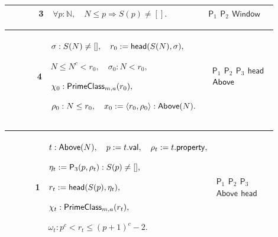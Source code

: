 \documentclass[12pt,reqno]{amsart}
\theoremstyle{blueplain}
\numberwithin{equation}{section}
\begin{document}
{\scriptsize \setlength{\parskip}{0pt}\nointerlineskip
\noindent 
\begin{tabular}{|@{}>{\centering\arraybackslash}m{0.10658\linewidth}|>{\centering\arraybackslash}m{0.03553\linewidth}|>{\centering\arraybackslash}m{0.52105\linewidth}|>{\centering\arraybackslash}m{0.23684\linewidth}|}
\hline
{\hypertarget{row:P3}{$\mathsf{P}$}} & {3} & {$\displaystyle \forall p:%
\mathbb{N},\quad N\le p\Rightarrow S(p)\ne[].$} & {\hyperlink{row:P1}{$%
\mathsf{P}_{1}$} \hyperlink{row:P2}{$\mathsf{P}_{2}$} \hyperlink{def:Window}{%
$\mathsf{Window}$}} \\ \hline
\end{tabular}%
}

{\scriptsize \setlength{\parskip}{0pt}\nointerlineskip
\noindent 
\begin{tabular}{|@{}>{\centering\arraybackslash}m{0.10658\linewidth}|>{\centering\arraybackslash}m{0.03553\linewidth}|>{\centering\arraybackslash}m{0.52105\linewidth}|>{\centering\arraybackslash}m{0.23684\linewidth}|}
\hline
{\hypertarget{row:P4}{$\mathsf{P}$}} & {4} & {$\displaystyle \sigma:S(N)\ne[]%
,\quad r_0:=\hyperlink{def:head}{\mathsf{head} }(S(N),\sigma),$ \par$%
\displaystyle N\le N^c<r_0,\quad\sigma_0:N<r_0,$ \par$\displaystyle \chi_0: 
\hyperlink{def:PrimeClass}{\mathsf{PrimeClass} }_{m,a}(r_0),$ \par$%
\displaystyle \rho_0:N\le r_0,\quad x_0:=\langle r_0,\rho_0\rangle: 
\hyperlink{def:Above}{\mathsf{Above} }(N).$} & {\hyperlink{row:P1}{$\mathsf{P%
}_{1}$} \hyperlink{row:P2}{$\mathsf{P}_{2}$} \hyperlink{row:P3}{$\mathsf{P}%
_{3}$} \hyperlink{def:head}{$\mathsf{head}$} \hyperlink{def:Above}{$\mathsf{%
Above}$}} \\ \hline
\end{tabular}%
}

{\scriptsize \setlength{\parskip}{0pt}\nointerlineskip
\noindent 
\begin{tabular}{|@{}>{\centering\arraybackslash}m{0.10658\linewidth}|>{\centering\arraybackslash}m{0.03553\linewidth}|>{\centering\arraybackslash}m{0.52105\linewidth}|>{\centering\arraybackslash}m{0.23684\linewidth}|}
\hline
{\hypertarget{row:R1}{$\mathsf{R}$}} & {1} & {$\displaystyle t:\hyperlink{def:Above}%
{\mathsf{Above} }(N),\quad p:=t.\mathsf{val},\quad\rho_t:=t.\mathsf{property}%
,$ \par$\displaystyle \eta_t:=\hyperlink{row:P3}{\mathsf{P}_{3} }%
(p,\rho_t):S(p)\ne[],$ \par$\displaystyle r_t:=\hyperlink{def:head}{\mathsf{%
head} }(S(p),\eta_t),$ \par$\displaystyle \chi_t:\hyperlink{def:PrimeClass}{%
\mathsf{PrimeClass} }_{m,a}(r_t),$ \par$\displaystyle \omega_t:p^c<r_t%
\le(p+1)^c-2.$} & {\hyperlink{row:P1}{$\mathsf{P}_{1}$} \hyperlink{row:P2}{$%
\mathsf{P}_{2}$} \hyperlink{row:P3}{$\mathsf{P}_{3}$} \hyperlink{def:Above}{$%
\mathsf{Above}$} \hyperlink{def:head}{$\mathsf{head}$}} \\ \hline
\end{tabular}
}
\end{document}
